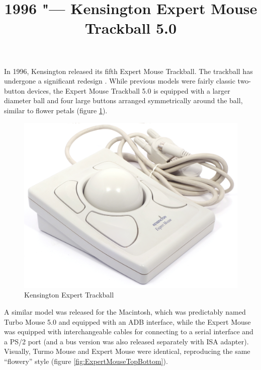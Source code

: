 \documentclass[11pt, a4paper]{article}
\begin{document}
\title{1996 "--- Kensington Expert Mouse Trackball 5.0}
\date{}
\maketitle
{}
In 1996, Kensington released its fifth Expert Mouse Trackball. The trackball has undergone a significant redesign \cite{KensingtonPC}. While previous models were fairly classic two-button devices, the Expert Mouse Trackball 5.0 is equipped with a larger diameter ball and four large buttons arranged symmetrically around the ball, similar to flower petals (figure \ref{fig:ExpertMousePic}).

\begin{figure}[h]
    \centering
    \includegraphics[scale=0.4]{1996_kensington_expert_trackball_5/pic_60.jpg}
    \caption{Kensington Expert Trackball}
    \label{fig:ExpertMousePic}
\end{figure}

A similar model was released for the Macintosh, which was predictably named Turbo Mouse 5.0 \cite{KensingtonMac} and equipped with an ADB interface, while the Expert Mouse was equipped with interchangeable cables for connecting to a serial interface and a PS/2 port (and a bus version was also released separately with ISA adapter). Visually, Turmo Mouse and Expert Mouse were identical, reproducing the same “flowery” style (figure \ref{fig:ExpertMouseTopBottom}).
\end{document}

